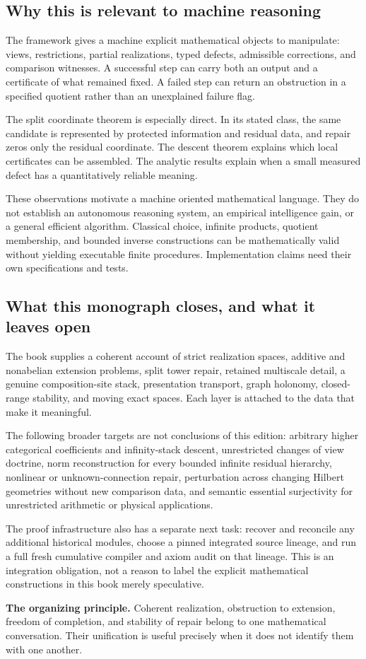 \subsection{Why this is relevant to machine reasoning}
The framework gives a machine explicit mathematical objects to manipulate: views, restrictions, partial realizations, typed defects, admissible corrections, and comparison witnesses. A successful step can carry both an output and a certificate of what remained fixed. A failed step can return an obstruction in a specified quotient rather than an unexplained failure flag.

The split coordinate theorem is especially direct. In its stated class, the same candidate is represented by protected information and residual data, and repair zeros only the residual coordinate. The descent theorem explains which local certificates can be assembled. The analytic results explain when a small measured defect has a quantitatively reliable meaning.

These observations motivate a machine oriented mathematical language. They do not establish an autonomous reasoning system, an empirical intelligence gain, or a general efficient algorithm. Classical choice, infinite products, quotient membership, and bounded inverse constructions can be mathematically valid without yielding executable finite procedures. Implementation claims need their own specifications and tests.

\subsection{What this monograph closes, and what it leaves open}
The book supplies a coherent account of strict realization spaces, additive and nonabelian extension problems, split tower repair, retained multiscale detail, a genuine composition-site stack, presentation transport, graph holonomy, closed-range stability, and moving exact spaces. Each layer is attached to the data that make it meaningful.

The following broader targets are not conclusions of this edition: arbitrary higher categorical coefficients and infinity-stack descent, unrestricted changes of view doctrine, norm reconstruction for every bounded infinite residual hierarchy, nonlinear or unknown-connection repair, perturbation across changing Hilbert geometries without new comparison data, and semantic essential surjectivity for unrestricted arithmetic or physical applications.

The proof infrastructure also has a separate next task: recover and reconcile any additional historical modules, choose a pinned integrated source lineage, and run a full fresh cumulative compiler and axiom audit on that lineage. This is an integration obligation, not a reason to label the explicit mathematical constructions in this book merely speculative.

\begin{insight}
\textbf{The organizing principle.} Coherent realization, obstruction to extension, freedom of completion, and stability of repair belong to one mathematical conversation. Their unification is useful precisely when it does not identify them with one another.
\end{insight}
